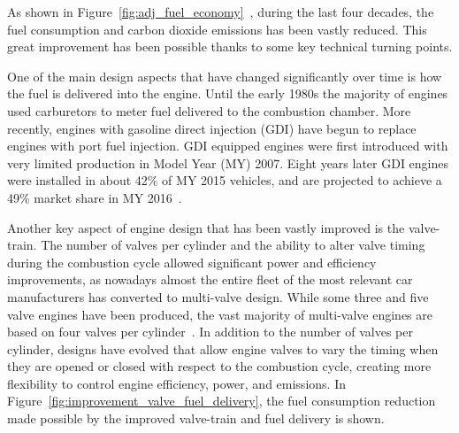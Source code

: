 As shown in Figure~\ref{fig:adj_fuel_economy}~\cite{EPA2016}, during the last four decades, the fuel consumption and carbon dioxide emissions has been vastly reduced. This great improvement has been possible thanks to some key technical turning points.

One of the main design aspects that have changed significantly over time is how the fuel is delivered into the engine. Until the early 1980s the majority of engines used carburetors to meter fuel delivered to the combustion chamber. More recently, engines with gasoline direct injection (GDI) have begun to replace engines with port fuel injection. GDI equipped engines were first introduced with very limited production in Model Year (MY) 2007. Eight years later GDI engines were installed in about 42\% of MY 2015 vehicles, and are projected to achieve a 49\% market share in MY 2016~\cite{EPA2016}.

Another key aspect of engine design that has been vastly improved is the valve-train. The number of valves per cylinder and the ability to alter valve timing during the combustion cycle allowed significant power and efficiency improvements, as nowadays almost the entire fleet of the most relevant car manufacturers has converted to multi-valve design. While some three and five valve engines have been produced, the vast majority of multi-valve engines are based on four valves per cylinder~\cite{EPA2016}. In addition to the number of valves per cylinder, designs have evolved that allow engine valves to vary the timing when they are opened or closed with respect to the combustion cycle, creating more flexibility to control engine efficiency, power, and emissions. In Figure~\ref{fig:improvement_valve_fuel_delivery}, the fuel consumption reduction made possible by the improved valve-train and fuel delivery is shown. 

